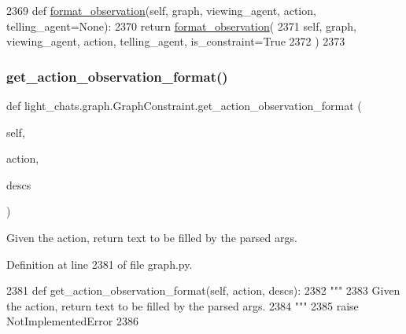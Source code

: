 \begin{DoxyCode}
2369     \textcolor{keyword}{def }\hyperlink{namespacelight__chats_1_1graph_a6d359942394976812f0055affc289f56}{format\_observation}(self, graph, viewing\_agent, action, telling\_agent=None):
2370         \textcolor{keywordflow}{return} \hyperlink{namespacelight__chats_1_1graph_a6d359942394976812f0055affc289f56}{format\_observation}(
2371             self, graph, viewing\_agent, action, telling\_agent, is\_constraint=\textcolor{keyword}{True}
2372         )
2373 
\end{DoxyCode}
\mbox{\label{classlight__chats_1_1graph_1_1GraphConstraint_a53754bb6025c16b76718f44dad075733}} 
\subsubsection{\texorpdfstring{get\+\_\+action\+\_\+observation\+\_\+format()}{get\_action\_observation\_format()}}
{\footnotesize\ttfamily def light\+\_\+chats.\+graph.\+Graph\+Constraint.\+get\+\_\+action\+\_\+observation\+\_\+format (\begin{DoxyParamCaption}\item[{}]{self,  }\item[{}]{action,  }\item[{}]{descs }\end{DoxyParamCaption})}

\begin{DoxyVerb}Given the action, return text to be filled by the parsed args.
\end{DoxyVerb}
 

Definition at line 2381 of file graph.\+py.


\begin{DoxyCode}
2381     \textcolor{keyword}{def }get\_action\_observation\_format(self, action, descs):
2382         \textcolor{stringliteral}{"""}
2383 \textcolor{stringliteral}{        Given the action, return text to be filled by the parsed args.}
2384 \textcolor{stringliteral}{        """}
2385         \textcolor{keywordflow}{raise} NotImplementedError
2386 
\end{DoxyCode}
\mbox{\label{classlight__chats_1_1graph_1_1GraphConstraint_ac824a43559c367bf625f79559f026c6b}} 
